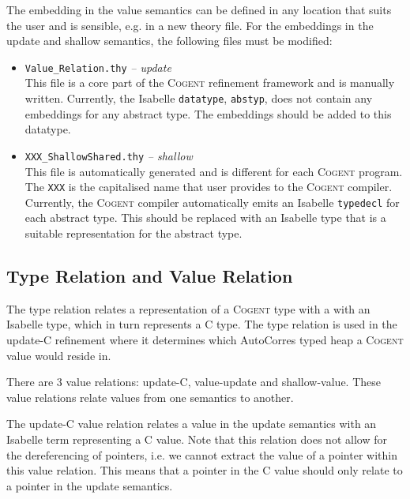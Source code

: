\documentclass{article}
\newcommand{\cogent}{\textsc{Cogent}\xspace}
\newcommand{\Cogent}{\textsc{Cogent}\xspace}
\begin{document}
The embedding in the value semantics can be defined in any location that
suits the user and is sensible,
e.g. in a new theory file.
For the embeddings in the update and shallow semantics, the following files
must be modified:
\begin{itemize}
\item \texttt{Value\_Relation.thy} \textit{-- update}\\
This file is a core part of the \Cogent refinement framework and is
manually written.
Currently, the Isabelle \texttt{datatype}, \texttt{abstyp},  does not
contain any embeddings for any abstract type.
The embeddings should be added to this datatype.
\item \texttt{XXX\_ShallowShared.thy} \textit{-- shallow}\\
This file is automatically generated and is different for each \cogent program.
The \texttt{XXX} is the capitalised name that user provides to the \cogent
compiler.
Currently, the \cogent compiler automatically emits an Isabelle
\texttt{typedecl} for each abstract type.
This should be replaced with an Isabelle type that is a suitable
representation for the abstract type.
\end{itemize}

\subsection{Type Relation and Value Relation}
The type relation relates a representation of a \cogent type with a with an
Isabelle type,
which in turn represents a C type.
The type relation is used in the update-C refinement where it determines
which AutoCorres typed heap a \cogent value would reside in.

There are 3 value relations: update-C, value-update and shallow-value.
These value relations relate values from one semantics to another.

The update-C value relation relates a value in the update semantics with an
Isabelle term representing a C value.
Note that this relation does not allow for the dereferencing of pointers,
i.e. we cannot extract the value of a pointer within this value relation.
This means that a pointer in the C value should only relate to a pointer in
the update semantics.
\end{document}
